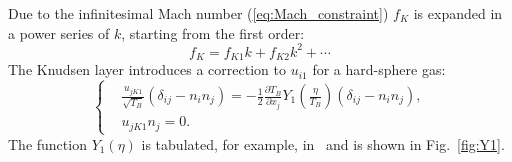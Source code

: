\documentclass[smallextended, referee]{svjour3} %
\newcommand{\pder}[2][]{\frac{\partial#1}{\partial#2}}
\begin{document}
Due to the infinitesimal Mach number (\ref{eq:Mach_constraint}) \(f_K\) is expanded
in a power series of \(k\), starting from the first order:
\[ f_K = f_{K1} k + f_{K2} k ^ 2 + \cdots \]
The Knudsen layer introduces a correction to \(u_{i1}\) for a hard-sphere gas:
\begin{equation}
	\left\{
	\begin{aligned}
		& \frac{u_{jK1}}{\sqrt{T_B}}(\delta_{ij}-n_in_j) =
			-\frac12\pder[T_B]{x_j} Y_1\left(\frac\eta{T_B}\right) (\delta_{ij}-n_in_j), \\
		& u_{jK1}n_j = 0.
	\end{aligned}
	\right. \label{eq:bound:v_K}
\end{equation}
The function \(Y_1(\eta)\) is tabulated, for example, in~\cite{Sone2002, Sone2007} and is shown in Fig.~\ref{fig:Y1}.
\end{document}
